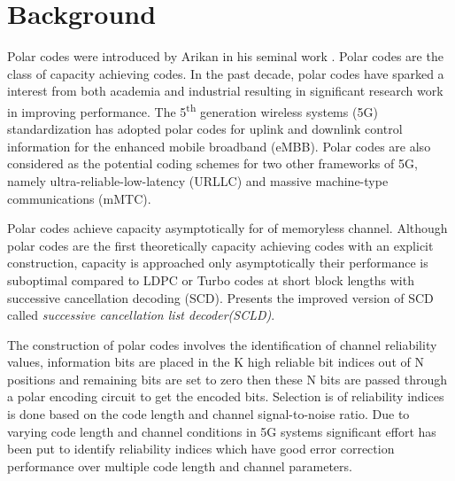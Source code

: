 \chapter{Background} \label{chap:Background}

\setcounter{secnumdepth}{3}
\renewcommand{\thesubsubsection}{\Alph{subsubsection}}



Polar codes were introduced by Arikan in his seminal work \cite{Arikan}. Polar codes are the class of capacity achieving codes. In the past decade, polar codes have sparked a interest from both academia and industrial resulting in significant research work in improving performance. The 5\textsuperscript{th} generation wireless systems (5G)  standardization has adopted polar codes for uplink and downlink control information for the enhanced mobile broadband (eMBB). Polar codes are also considered as the potential coding schemes for two other frameworks of 5G, namely ultra-reliable-low-latency (URLLC) and massive machine-type communications (mMTC).


Polar codes achieve capacity asymptotically for of memoryless channel. Although polar codes are the first theoretically capacity achieving codes with an explicit construction, capacity is approached only asymptotically their performance is suboptimal compared to LDPC or Turbo codes at short block lengths with successive cancellation decoding (SCD). \cite{SCL} Presents the improved version of SCD called \emph{successive cancellation list decoder(SCLD)}.


The construction of polar codes involves the identification of channel reliability values, information bits are placed in the K high reliable bit indices out of N positions and remaining bits are set to zero then these N bits are passed through a polar encoding circuit to get the encoded bits. Selection is of reliability indices is done based on the code length and channel signal-to-noise ratio. Due to varying code length and channel conditions in 5G systems significant effort has been put to identify reliability indices which have good error correction performance over multiple code length and channel parameters.

